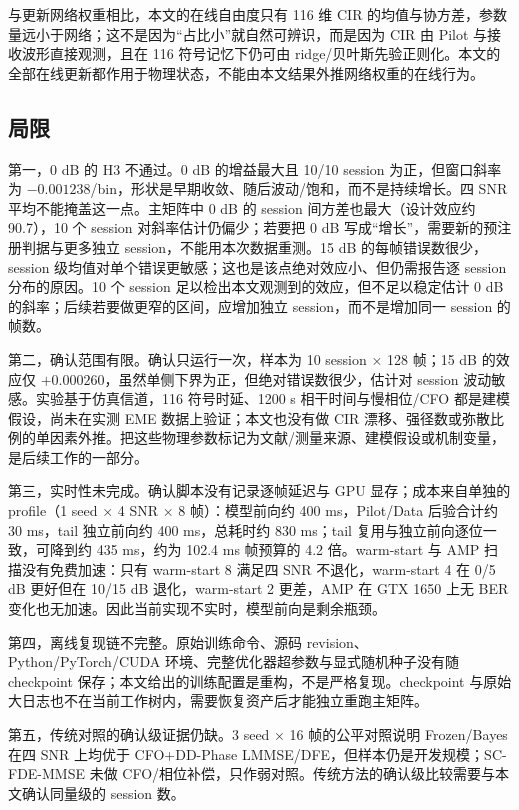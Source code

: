 与更新网络权重相比，本文的在线自由度只有 116 维 CIR 的均值与协方差，参数量远小于网络；这不是因为“占比小”就自然可辨识，而是因为 CIR 由 Pilot 与接收波形直接观测，且在 116 符号记忆下仍可由 ridge/贝叶斯先验正则化。本文的全部在线更新都作用于物理状态，不能由本文结果外推网络权重的在线行为。

\subsection{局限}

第一，0 dB 的 H3 不通过。0 dB 的增益最大且 10/10 session 为正，但窗口斜率为 $-0.001238$/bin，形状是早期收敛、随后波动/饱和，而不是持续增长。四 SNR 平均不能掩盖这一点。主矩阵中 0 dB 的 session 间方差也最大（设计效应约 90.7），10 个 session 对斜率估计仍偏少；若要把 0 dB 写成“增长”，需要新的预注册判据与更多独立 session，不能用本次数据重测。15 dB 的每帧错误数很少，session 级均值对单个错误更敏感；这也是该点绝对效应小、但仍需报告逐 session 分布的原因。10 个 session 足以检出本文观测到的效应，但不足以稳定估计 0 dB 的斜率；后续若要做更窄的区间，应增加独立 session，而不是增加同一 session 的帧数。

第二，确认范围有限。确认只运行一次，样本为 10 session × 128 帧；15 dB 的效应仅 $+0.000260$，虽然单侧下界为正，但绝对错误数很少，估计对 session 波动敏感。实验基于仿真信道，116 符号时延、1200 s 相干时间与慢相位/CFO 都是建模假设，尚未在实测 EME 数据上验证；本文也没有做 CIR 漂移、强径数或弥散比例的单因素外推。把这些物理参数标记为文献/测量来源、建模假设或机制变量，是后续工作的一部分。

第三，实时性未完成。确认脚本没有记录逐帧延迟与 GPU 显存；成本来自单独的 profile（1 seed × 4 SNR × 8 帧）：模型前向约 400 ms，Pilot/Data 后验合计约 30 ms，tail 独立前向约 400 ms，总耗时约 830 ms；tail 复用与独立前向逐位一致，可降到约 435 ms，约为 102.4 ms 帧预算的 4.2 倍。warm-start 与 AMP 扫描没有免费加速：只有 warm-start 8 满足四 SNR 不退化，warm-start 4 在 0/5 dB 更好但在 10/15 dB 退化，warm-start 2 更差，AMP 在 GTX 1650 上无 BER 变化也无加速。因此当前实现不实时，模型前向是剩余瓶颈。

第四，离线复现链不完整。原始训练命令、源码 revision、Python/PyTorch/CUDA 环境、完整优化器超参数与显式随机种子没有随 checkpoint 保存；本文给出的训练配置是重构，不是严格复现。checkpoint 与原始大日志也不在当前工作树内，需要恢复资产后才能独立重跑主矩阵。

第五，传统对照的确认级证据仍缺。3 seed × 16 帧的公平对照说明 Frozen/Bayes 在四 SNR 上均优于 CFO+DD-Phase LMMSE/DFE，但样本仍是开发规模；SC-FDE-MMSE 未做 CFO/相位补偿，只作弱对照。传统方法的确认级比较需要与本文确认同量级的 session 数。

